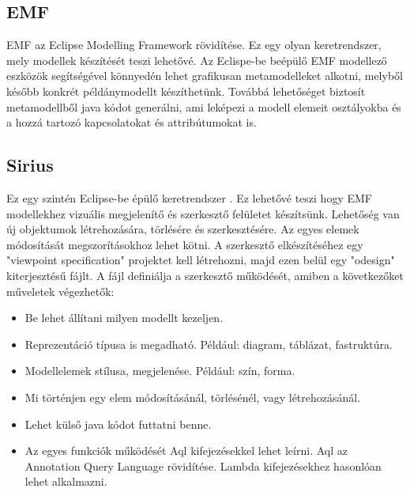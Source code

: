 \subsection{EMF}
\nocite{EMFtut}
EMF az Eclipse Modelling Framework \cite{EMF} rövidítése. Ez egy olyan keretrendszer, mely modellek készítését teszi lehetővé. Az Eclispe-be beépülő EMF modellező eszközök segítségével könnyedén lehet grafikusan metamodelleket alkotni, melyből később konkrét példánymodellt készíthetünk. Továbbá lehetőséget biztosít metamodellből java kódot generálni, ami leképezi a modell elemeit osztályokba és a hozzá tartozó kapcsolatokat és attribútumokat is.

\subsection{Sirius}
\nocite{SiruisTutNagyASz}
\nocite{SiruisTutStart}
\nocite{SiruisTutAdv}
Ez egy szintén Eclipse-be épülő keretrendszer \cite{Sirius}. Ez lehetővé teszi hogy EMF modellekhez vizuális megjelenítő és szerkesztő felületet készítsünk. Lehetőség van új objektumok létrehozására, törlésére és szerkesztésére. Az egyes elemek módosítását megszorításokhoz lehet kötni. A szerkesztő elkészítéséhez egy "viewpoint specification" projektet kell létrehozni, majd ezen belül egy "odesign" kiterjesztésű fájlt. A fájl definiálja a szerkesztő működését, amiben a következőket műveletek végezhetők:
\begin{itemize}  
	\item Be lehet állítani milyen modellt kezeljen.
	\item Reprezentáció típusa is megadható. Például: diagram, táblázat, fastruktúra.
	\item Modellelemek stílusa, megjelenése. Például: szín, forma.
	\item Mi történjen egy elem módosításánál, törlésénél, vagy létrehozásánál.
	\item Lehet külső java kódot futtatni benne.
	\item Az egyes funkciók működését Aql kifejezésekkel lehet leírni. Aql az Annotation Query Language \cite{Aql} rövidítése. Lambda \cite{Lambda} kifejezésekhez hasonlóan lehet alkalmazni. 
	
\end{itemize}



